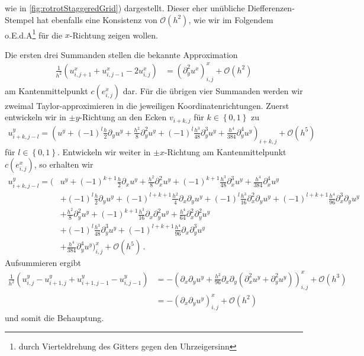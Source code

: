 \documentclass[a4paper,11pt]{scrartcl}
\newcommand{\landau}{\mathcal{O}}
\newcommand{\formPeriod}{\,\text{.}}
\begin{document}
    wie in \autoref{fig:rotrotStaggeredGrid}) dargestellt.
    Dieser eher unübliche Diefferenzen-Stempel hat ebenfalls eine Konsistenz von \( \landau(h^{2}) \),
    wie wir im Folgendem o.E.d.A\footnote{durch Vierteldrehung des Gitters gegen den Uhrzeigersinn} für die \( x \)-Richtung zeigen wollen.

    Die ersten drei Summanden stellen die bekannte Approximation
    \begin{align}
      \frac{1}{h^{2}}\left( u^{x}_{i,j+1} +  u^{x}_{i,j-1} - 2u^{x}_{i,j}\right)
          &= \left( \partial_{y}^{2}u^{x} \right)^{x}_{i,j} + \landau(h^{2})
    \end{align}
    am Kantenmittelpunkt \( c(e^{x}_{i,j}) \) dar.
    Für die übrigen vier Summanden werden wir zweimal Taylor-approximieren in die jeweiligen Koordinatenrichtungen.
    Zuerst entwickeln wir in \( \pm y \)-Richtung an den Ecken \( v_{i+k,j} \) für \( k\in\left\{ 0,1 \right\} \) zu
    \begin{align}
      u^{y}_{i+k,j-l} 
          = \left( u^{y} + (-1)^{l} \frac{h}{2}\partial_{y}u^{y} + \frac{h^{2}}{8}\partial_{y}^{2}u^{y} 
                    + (-1)^{l}\frac{h^{3}}{48}\partial_{y}^{3}u^{y} + \frac{h^{4}}{384}\partial_{y}^{4}u^{y}\right)_{i+k,j}
             +\landau(h^{5})
    \end{align}
    für \( l\in\left\{ 0,1 \right\} \).
    Entwickeln wir weiter in \( \pm x \)-Richtung am Kantenmittelpunkt \( c(e^{x}_{i,j}) \), so erhalten wir
    \begin{align}
      u^{y}_{i+k,j-l}
        = \Big( &u^{y} + (-1)^{k+1}\frac{h}{2}\partial_{x}u^{y} + \frac{h^{2}}{8}\partial_{x}^{2}u^{y} 
                    + (-1)^{k+1}\frac{h^{3}}{48}\partial_{x}^{3}u^{y} + \frac{h^{4}}{384}\partial_{x}^{4}u^{y}  \\
                 &+(-1)^{l} \frac{h}{2}\partial_{y}u^{y} + (-1)^{l+k+1} \frac{h^{2}}{4}\partial_{x}\partial_{y}u^{y}
                      +(-1)^{l} \frac{h^{3}}{16}\partial_{x}^{2}\partial_{y}u^{y} + (-1)^{l+k+1} \frac{h^{4}}{96}\partial_{x}^{3}\partial_{y}u^{y} \\
                 &+ \frac{h^{2}}{8}\partial_{y}^{2}u^{y} + (-1)^{k+1} \frac{h^{3}}{16}\partial_{x}\partial_{y}^{2}u^{y}
                      + \frac{h^{4}}{64}\partial_{x}^{2}\partial_{y}^{2}u^{y} \\
                 &+(-1)^{l}\frac{h^{3}}{48}\partial_{y}^{3}u^{y} + (-1)^{l+k+1} \frac{h^{4}}{96}\partial_{x}\partial_{y}^{3}u^{y} \\
                 &+ \frac{h^{4}}{384}\partial_{y}^{4}u^{y}\Big)^{x}_{i,j} + \landau(h^{5}) \formPeriod
    \end{align}
    Aufsummieren ergibt
    \begin{align}
      \frac{1}{h^{2}}\left( u^{y}_{i,j} - u^{y}_{i+1,j} + u^{y}_{i+1,j-1} -u^{y}_{i,j-1} \right)
          &= -\left( \partial_{x}\partial_{y}u^{y} 
              + \frac{h^{2}}{96}\partial_{x}\partial_{y}\left( \partial_{x}^{2}u^{y} + \partial_{y}^{2}u^{y} \right)\right)^{x}_{i,j}
              +\landau(h^{3}) \\
          &= -\left( \partial_{x}\partial_{y}u^{y} \right)^{x}_{i,j}  +\landau(h^{2})
    \end{align}
    und somit die Behauptung.
\end{document}
